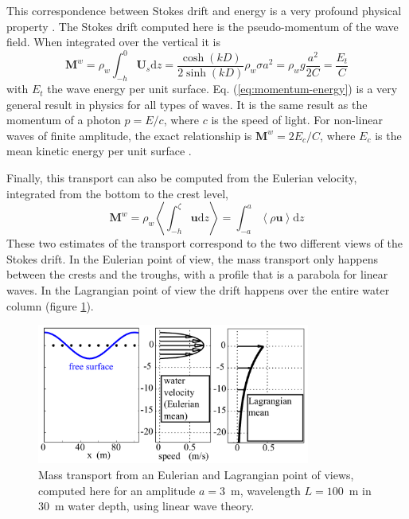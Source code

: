 This correspondence between Stokes drift and energy is a very profound physical property \citep{Andrews&McIntyre1978b}. 
The Stokes drift computed here is the pseudo-momentum of the wave field. When integrated over the vertical it is 
\begin{equation}
    {\mathbf M}^w=\rho_w \int_{-h}^0 {\mathbf U}_s {\mathrm d} z =
    \frac{\cosh (kD)}{2 \sinh (kD)} \rho_w \sigma a^2 = \rho_w g
    \frac{a^2}{2C} =  \frac{E_t}{C} \label{eq:momentum-energy}
\end{equation}
with $E_t$ the wave energy per unit surface. Eq. (\ref{eq:momentum-energy}) is a very general result in physics for all types of waves. 
It is the same result as the momentum of a photon $p=E/c$, where $c$ is the speed of light. For non-linear waves of finite 
amplitude, the exact relationship is ${\mathbf M}^w=2 {E_c}/{C}$, where $E_c$ is the mean kinetic energy per unit surface \citep[][
see chapter \ref{ch_nonlin_per}]{Longuet-Higgins1984}.

Finally, this transport can also be computed from the Eulerian velocity, 
integrated from the bottom to the crest level, 
\begin{equation}
    {\mathbf M}^w=\rho_w \left< \int_{-h}^\zeta {\mathbf u} {\mathrm d} z \right> =
    \int_{-a}^a \left< \rho {\mathbf u} \right> {\mathrm d} z
\end{equation}
These two estimates of the transport correspond to the two different views of the Stokes drift. 
In the Eulerian point of view, the mass transport only happens between the crests and the troughs, with a profile that 
is a parabola for linear waves. In the Lagrangian point of view the drift happens over the entire water column (figure \ref{Eul_Lag_drift}).
\begin{figure}
\centerline{\includegraphics[width=0.8\textwidth]{FIGS_CH_MOMENTUM/Eul_Lag_drift_en.pdf}}
  \caption{Mass transport from an Eulerian and Lagrangian point of views, computed here 
for an amplitude $a=3$~m, wavelength $L=100$~m in 30~m water depth, using 
linear wave theory.}
\label{Eul_Lag_drift}
\end{figure}

